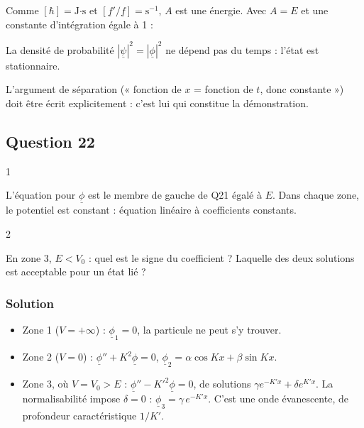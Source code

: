 \documentclass[11pt,a4paper]{article}
\providecommand{\tightlist}{\setlength{\itemsep}{0pt}\setlength{\parskip}{0pt}}
\newcommand{\equationajustee}[1]{%
  \sbox{\boiteequation}{$\displaystyle #1$}%
  \ifdim\wd\boiteequation>\linewidth
    \[\resizebox{\linewidth}{!}{\usebox{\boiteequation}}\]%
  \else
    \[#1\]%
  \fi}
\begin{document}
Comme \([\hbar] = \text{J·s}\) et \([\underline f'/\underline f] = \text{s}^{-1}\), \(A\) est une énergie. Avec \(A = E\) et une constante d'intégration égale à 1 :

\equationajustee{\boxed{\underline f(t) = \exp\left(-\frac{iEt}{\hbar}\right)}}

La densité de probabilité \(|\underline\psi|^2 = |\underline\phi|^2\) ne dépend pas du temps : l'état est stationnaire.

\begin{jury}

L'argument de séparation (« fonction de \(x\) = fonction de \(t\), donc constante ») doit être écrit explicitement : c'est lui qui constitue la démonstration.

\end{jury}

\hypertarget{question-22}{%
\subsection{Question 22}\label{question-22}}

\begin{indication}{1}

L'équation pour \(\underline\phi\) est le membre de gauche de Q21 égalé à \(E\). Dans chaque zone, le potentiel est constant : équation linéaire à coefficients constants.

\end{indication}

\begin{indication}{2}

En zone 3, \(E<V_0\) : quel est le signe du coefficient ? Laquelle des deux solutions est acceptable pour un état lié ?

\end{indication}

\hypertarget{solution-21}{%
\subsubsection{Solution}\label{solution-21}}

\equationajustee{\boxed{-\frac{\hbar^2}{2\mu}\underline\phi'' + V_{\text{app}}(x)\,\underline\phi = E\,\underline\phi}}

\begin{itemize}
\tightlist
\item
  Zone 1 (\(V = +\infty\)) : \(\boxed{\underline\phi_1 = 0}\), la particule ne peut s'y trouver.
\item
  Zone 2 (\(V = 0\)) : \(\underline\phi'' + K^2\underline\phi = 0\), \(\boxed{\underline\phi_2 = \alpha\cos Kx + \beta\sin Kx}\).
\item
  Zone 3, où \(V = V_0>E\) : \(\underline\phi'' - K'^2\underline\phi = 0\), de solutions \(\gamma e^{-K'x} + \delta e^{K'x}\). La normalisabilité impose \(\delta = 0\) : \(\boxed{\underline\phi_3 = \gamma\,e^{-K'x}}\). C'est une onde évanescente, de profondeur caractéristique \(1/K'\).
\end{itemize}
\end{document}
